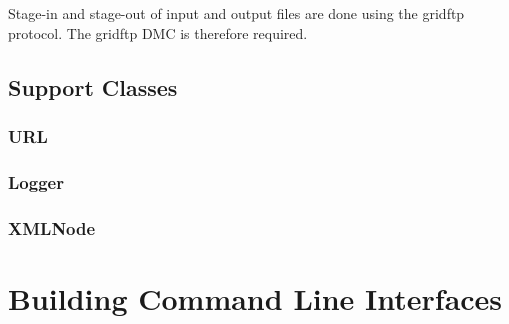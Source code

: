 \documentclass{book}
\begin{document}
Stage-in and stage-out of input and output files are done using the
gridftp protocol. The gridftp DMC is therefore required.

\section{Support Classes}
\subsection{URL}
\subsection{Logger}
\subsection{XMLNode}

\chapter{Building Command Line Interfaces}
\label{sec:cli}


\end{document}
